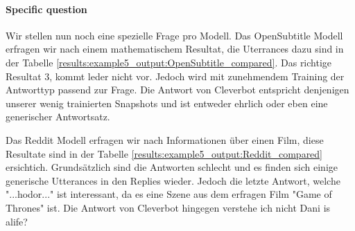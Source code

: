\paragraph{Specific question}Wir stellen nun noch eine spezielle Frage pro Modell. Das OpenSubtitle Modell erfragen wir nach einem mathematischem Resultat, die Uterrances dazu sind in der Tabelle \ref{results:example5_output:OpenSubtitle_compared}. Das richtige Resultat 3, kommt leder nicht vor. Jedoch wird mit zunehmendem Training der Antworttyp passend zur Frage. Die Antwort von Cleverbot entspricht denjenigen unserer wenig trainierten Snapshots und ist entweder ehrlich oder eben eine generischer Antwortsatz.

Das Reddit Modell erfragen wir nach Informationen über einen Film, diese Resultate sind in der Tabelle \ref{results:example5_output:Reddit_compared} ersichtich. Grundsätzlich sind die Antworten schlecht und es finden sich einige generische Utterances in den Replies wieder. Jedoch die letzte Antwort, welche "...hodor..." ist interessant, da es eine Szene aus dem erfragen Film "Game of Thrones" ist. Die Antwort von Cleverbot hingegen verstehe ich nicht Dani is alife? 

